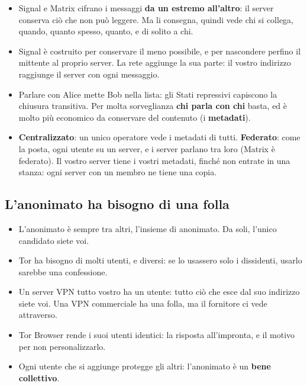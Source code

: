 \begin{itemize}
    \item Signal e Matrix cifrano i messaggi \textbf{da un estremo all'altro}: il server conserva ciò che non può leggere. Ma li consegna,
          quindi vede chi si collega, quando, quanto spesso, quanto, e di solito a chi.
    \item Signal è costruito per conservare il meno possibile, e per nascondere perfino il mittente al proprio server. La rete aggiunge la
          sua parte: il vostro indirizzo raggiunge il server con ogni messaggio.
    \item Parlare con Alice mette Bob nella lista: gli Stati repressivi capiscono la chiusura transitiva. Per molta sorveglianza
          \textbf{chi parla con chi} basta, ed è molto più economico da conservare del contenuto (i \textbf{metadati}).
    \item \textbf{Centralizzato}: un unico operatore vede i metadati di tutti. \textbf{Federato}: come la posta, ogni utente su un server, e
          i server parlano tra loro (Matrix è federato). Il vostro server tiene i vostri metadati, finché non entrate in una stanza: ogni
          server con un membro ne tiene una copia.
\end{itemize}


\subsection{L'anonimato ha bisogno di una folla}

\begin{itemize}
    \item L'anonimato è sempre tra altri, l'insieme di anonimato. Da soli, l'unico candidato siete voi.
    \item Tor ha bisogno di molti utenti, e diversi: se lo usassero solo i dissidenti, usarlo sarebbe una confessione.
    \item Un server VPN tutto vostro ha un utente: tutto ciò che esce dal suo indirizzo siete voi. Una VPN commerciale ha una folla, ma il
          fornitore ci vede attraverso.
    \item Tor Browser rende i suoi utenti identici: la risposta all'impronta, e il motivo per non personalizzarlo.
    \item Ogni utente che si aggiunge protegge gli altri: l'anonimato è un \textbf{bene collettivo}.
\end{itemize}

